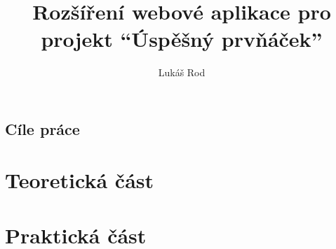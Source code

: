 \documentclass[thesis=M,czech]{FITthesis}[2019/12/23]
\title{Rozšíření webové aplikace pro projekt \enquote{Úspěšný prvňáček}}
\author{Lukáš Rod} %
\begin{document}
    
    \begin{introduction}
    	
    \end{introduction}
    
    \chapter{Cíle práce}
        
    
    \part{Teoretická část}
        
        
    \part{Praktická část}
        
        
    
    \begin{conclusion}
    	
    \end{conclusion}
    
    \printbibliography
    \appendix
    
\end{document}
